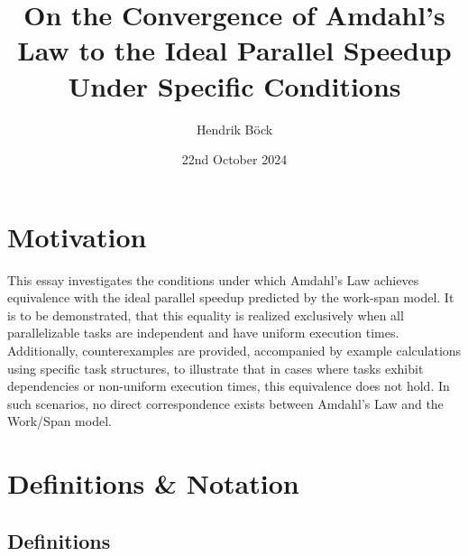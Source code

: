 \documentclass[
  a4paper, %
]{kaohandt}
\begin{document}
\pagestyle{centeredpagenum.scrheadings}

\title{On the Convergence of Amdahl's Law to the Ideal Parallel Speedup Under Specific Conditions}

\author[HB]{Hendrik B\"ock}

\date{22nd October 2024}


\maketitle

\margintoc


\section{Motivation}

This essay investigates the conditions under which Amdahl's Law achieves equivalence with the ideal parallel speedup predicted by the work-span model. It is to be demonstrated, that this equality is realized exclusively when all parallelizable tasks are independent and have uniform execution times. Additionally, counterexamples are provided, accompanied by example calculations using specific task structures, to illustrate that in cases where tasks exhibit dependencies or non-uniform execution times, this equivalence does not hold. In such scenarios, no direct correspondence exists between Amdahl's Law and the Work/Span model.

\section{Definitions \& Notation}

\subsection{Definitions}
\end{document}
